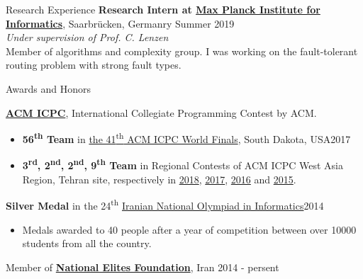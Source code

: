 \documentclass{resume} %
\begin{document}

\begin{rSection}{Research Experience}
{\bf Research Intern at \href{https://www.mpi-inf.mpg.de/}{Max Planck Institute for Informatics}}, \small{Saarbr{\"u}cken, Germanry \hfill Summer 2019}
\\\textit{Under supervision of Prof. C. Lenzen}
	\\Member of algorithms and complexity group. I was working on the fault-tolerant routing problem with strong fault types.
\end{rSection}


\begin{rSection}{Awards and Honors}
	
	{\bf \href{http://icpc.baylor.edu/}{ACM ICPC}}, International Collegiate Programming Contest by ACM.
	\begin{itemize}
		\item {\bf 56\textsuperscript{th} Team} in
		\href{https://icpc.baylor.edu/community/results-2017}{the 41\textsuperscript{th} ACM ICPC World Finals},
		South Dakota, USA\hfill 2017
		
		\item {\bf 3\textsuperscript{rd}, 2\textsuperscript{nd}, 2\textsuperscript{nd}, 9\textsuperscript{th} Team} in Regional Contests of ACM ICPC West Asia Region,
		Tehran site, respectively in
		\href{http://icpc.sharif.edu/acmicpc18/scoreboard/}{2018},
		\href{http://icpc.sharif.edu/acmicpc17/scoreboard/}{2017},
		\href{http://icpc.sharif.edu/acmicpc16/scoreboard/}{2016} and
		\href{http://icpc.sharif.edu/acmicpc15/scoreboard/}{2015}.
	\end{itemize}
	
	{\bf Silver Medal} in the 24\textsuperscript{th} \href{http://inoi.ir/}{Iranian National Olympiad in Informatics}\hfill 2014
	\begin{itemize}
		\item[] Medals awarded to 40 people after a year of competition between over 10000 students from all the country.
	\end{itemize}
	
	Member of \href{https://www.bmn.ir/}{{\bf National Elites Foundation}}, Iran \hfill 2014 - persent
	
\end{rSection}
\end{document}
